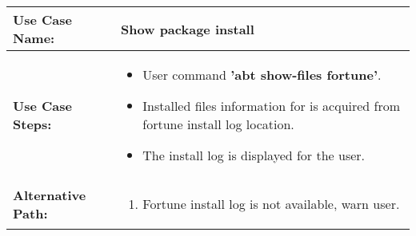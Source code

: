 \medskip

\begin{tabularx}{\linewidth}{|l|X|}
\hline
\textbf{Use Case Name:} & \textbf{Show package install} \\
\hline
\textbf{Use Case Steps:} & 
\begin{minipage}{\linewidth} 
  \vspace{0.05em}
  \begin{itemize}
    \item User command \textbf{'abt show-files fortune'}.
    \item Installed files information for is acquired from fortune install log location.
    \item The install log is displayed for the user.
  \end{itemize}
  \vspace{0.05em}
\end{minipage}
\\
\hline 
\textbf{Alternative Path:} &
\begin{minipage}{\linewidth}
  \vspace{0.05em} 
  \begin{enumerate}
    \item Fortune install log is not available, warn user.
  \end{enumerate}
  \vspace{0.05em} 
\end{minipage}
\\
\hline
\end{tabularx}

\newpage

